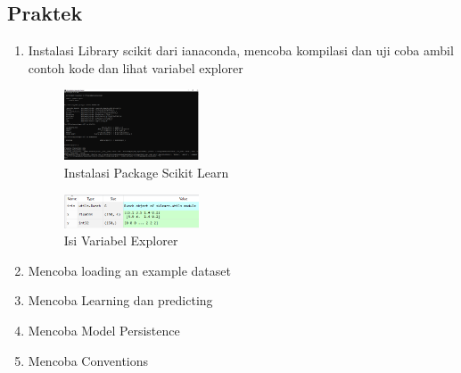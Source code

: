 \subsection{Praktek}
\begin{enumerate}
	\item Instalasi Library scikit dari ianaconda, mencoba kompilasi dan uji coba ambil contoh kode dan lihat variabel explorer
	\hfill\break
	\begin{figure}[H]
		\includegraphics[width=4cm]{figures/1174008/1/instalasi.PNG}
		\centering
		\caption{Instalasi Package Scikit Learn}
	\end{figure}
	\begin{figure}[H]
		\includegraphics[width=4cm]{figures/1174008/1/variable.PNG}
		\centering
		\caption{Isi Variabel Explorer}
	\end{figure}

	\item Mencoba loading an example dataset
	\hfill\break
	

	\item Mencoba Learning dan predicting
	\hfill\break
	

	\item Mencoba Model Persistence
	\hfill\break
	

	\item Mencoba Conventions
	\hfill\break
	
\end{enumerate}

